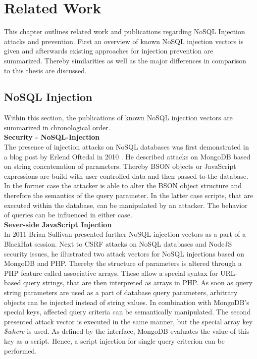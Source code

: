 \chapter{Related Work}
This chapter outlines related work and publications regarding NoSQL Injection attacks and prevention. First an overview of known NoSQL injection vectors is given and afterwards existing approaches for injection prevention are summarized. Thereby similarities as well as the major differences in comparison to this thesis are discussed.

\section{NoSQL Injection}
Within this section, the publications of known NoSQL injection vectors are summarized in chronological order. \\

\textbf{Security - NoSQL-Injection}\cite{Oftedal:2010} \\
The presence of injection attacks on NoSQL databases was first demonstrated in a blog post by Erlend Oftedal in 2010 \cite{Oftedal:2010}. He described attacks on MongoDB based on string concatenation of parameters. Thereby BSON objects or JavaScript expressions are build with user controlled data and then passed to the database. In the former case the attacker is able to alter the BSON object structure and therefore the semantics of the query parameter. In the latter case scripts, that are executed within the database, can be manipulated by an attacker. The behavior of queries can be influenced in either case. \\

\textbf{Sever-side JavaScript Injection}\cite{Sullivan:2011} \\
In 2011 Brian Sullivan presented further NoSQL injection vectors as a part of a BlackHat session. Next to CSRF attacks on NoSQL databases and NodeJS security issues, he illustrated two attack vectors for NoSQL injections based on MongoDB and PHP. Thereby the structure of parameters is altered through a PHP feature called associative arrays. These allow a special syntax for URL-based query strings, that are then interpreted as arrays in PHP. As soon as query string parameters are used as a part of database query parameters, arbitrary objects can be injected instead of string values. In combination with MongoDB's special keys, affected query criteria can be semantically manipulated. The second presented attack vector is executed in the same manner, but the special array key \textit{\$where} is used. As defined by the interface, MongoDB evaluates the value of this key as a script. Hence, a script injection for single query criterion can be performed. \\

